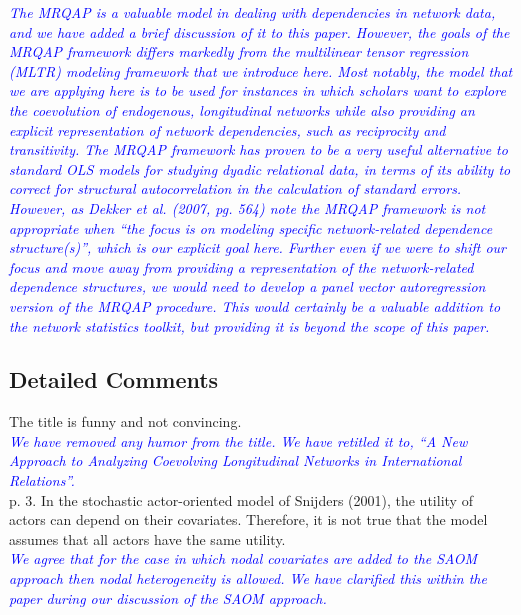 \textcolor{blue}{\emph{
	The MRQAP is a valuable model in dealing with dependencies in network data, and we have added a brief discussion of it to this paper. However, the goals of the MRQAP framework differs markedly from the multilinear tensor regression (MLTR) modeling framework that we introduce here. Most notably, the model that we are applying here is to be used for instances in which scholars want to explore the coevolution of endogenous, longitudinal networks while also providing an explicit representation of network dependencies, such as reciprocity and transitivity. The MRQAP framework has proven to be a very useful alternative to standard OLS models for studying dyadic relational data, in terms of its ability to correct for structural autocorrelation in the calculation of standard errors. However, as Dekker et al. (2007, pg. 564) note the MRQAP framework is not appropriate when ``the focus is on modeling specific network-related dependence structure(s)'', which is our explicit goal here. Further even if we were to shift our focus and move away from providing a representation of the network-related dependence structures, we would need to develop a panel vector autoregression version of the MRQAP procedure. This would certainly be a valuable addition to the network statistics toolkit, but providing it is beyond the scope of this paper.
}} \\

\subsection{Detailed Comments}

The title is funny and not convincing. \\

\textcolor{blue}{\emph{
	We have removed any humor from the title. We have retitled it to, ``A New Approach to Analyzing Coevolving Longitudinal Networks in International Relations''. 
}} \\

p. 3. In the stochastic actor-oriented model of Snijders (2001), the utility of actors can depend on their covariates. Therefore, it is not true that the model assumes that all actors have the same utility. \\

\textcolor{blue}{\emph{
	We agree that for the case in which nodal covariates are added to the SAOM approach then nodal heterogeneity is allowed. We have clarified this within the paper during our discussion of the SAOM approach.
}} \\

